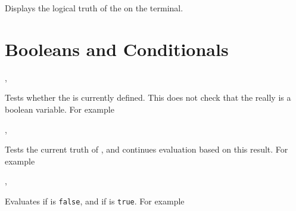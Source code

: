 \documentclass[oneside]{book}
\begin{document}
\begin{function}{\BoolVarShow}
\begin{syntax}
 
\end{syntax}
Displays the logical truth of the  on the terminal.
\end{function}

\section{Booleans and Conditionals}

\begin{function}{\BoolIfExist,\BoolIfExistTF}
\begin{syntax}
 
   
\end{syntax}
Tests whether the  is currently defined.  This does not
check that the  really is a boolean variable.
For example
\begin{demohigh}
\BoolIfExistTF {} {}
\BoolIfExistTF {} {}
\end{demohigh}
\end{function}

\begin{function}{\BoolVarIf,\BoolVarIfTF}
\begin{syntax}
 
   
\end{syntax}
Tests the current truth of , and continues evaluation
based on this result. For example
\begin{demohigh}
\BoolSetTrue \lTmpaBool
\BoolVarIfTF {} {}
\BoolSetFalse \lTmpaBool
\BoolVarIfTF {} {}
\end{demohigh}
\end{function}

\begin{function}{\BoolVarNot,\BoolVarNotTF}
\begin{syntax}
 
   
\end{syntax}
Evaluates  if  is \verb!false!,
and  if  is \verb!true!.
For example
\begin{demohigh}
 {} {}
\end{demohigh}
\end{function}
\end{document}

